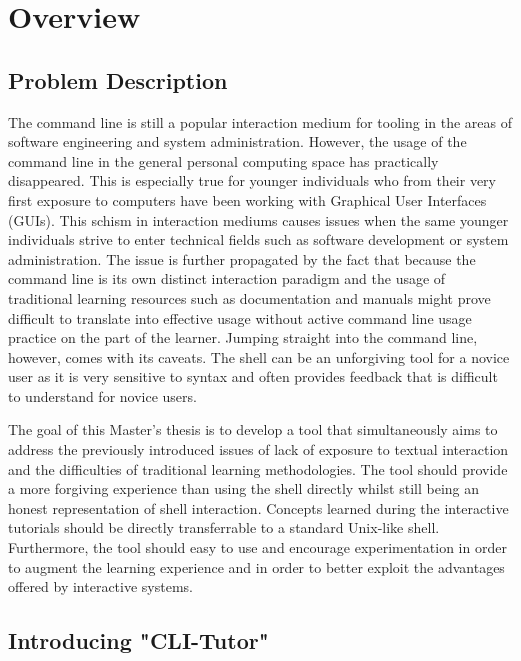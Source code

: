 \chapter{Overview}
\section{Problem Description}

The command line is still a popular interaction medium for tooling in the areas
of software engineering and system administration. However, the usage of the
command line in the general personal computing space has practically
disappeared. This is especially true for younger individuals who from their
very first exposure to computers have been working with Graphical User
Interfaces (GUIs). This schism in interaction mediums causes issues when the
same younger individuals strive to enter technical fields such as software
development or system administration. The issue is further propagated by the
fact that because the command line is its own distinct interaction paradigm and
the usage of traditional learning resources such as documentation and manuals
might prove difficult to translate into effective usage without active command
line usage practice on the part of the learner. Jumping straight into the
command line, however, comes with its caveats. The shell can be an unforgiving
tool for a novice user as it is very sensitive to syntax and often provides
feedback that is difficult to understand for novice users.

The goal of this Master's thesis is to develop a tool that simultaneously aims
to address the previously introduced issues of lack of exposure to textual
interaction and the difficulties of traditional learning methodologies. The
tool should provide a more forgiving experience than using the shell directly
whilst still being an honest representation of shell interaction. Concepts
learned during the interactive tutorials should be directly transferrable to a
standard Unix-like shell. Furthermore, the tool should easy to use and
encourage experimentation in order to augment the learning experience and in
order to better exploit the advantages offered by interactive systems.

%

\section{Introducing "CLI-Tutor"}

